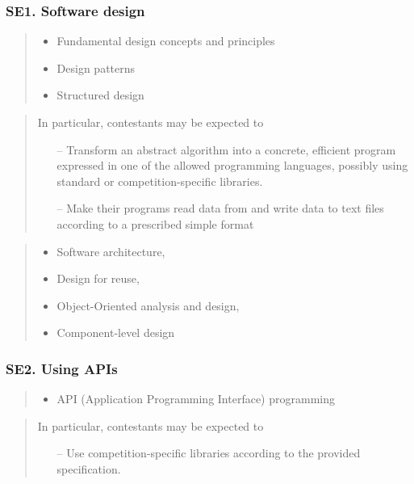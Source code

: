 \documentclass[a4paper,11pt,oneside]{article}
\newcommand{\cmark}{\ding{51}}%
\newcommand{\xmark}{\ding{55}}%
\newcommand{\CC}[1]{#1}
\newcommand{\Ccodeonly}{{\small\cmark\faFileText}}
\newcommand{\Cexcluded}{{\small\xmark}}
\newcommand{\Icodeonly}{\item[\hbox to 1.8em{\Ccodeonly\hfill}]}
\newcommand{\Iexcluded}{\item[\hbox to 1.8em{\Cexcluded\hfill}]}
\newenvironment{myitemize}{\begin{quote}\begin{itemize}\itemsep 0pt}{\end{itemize}\end{quote}}
\begin{document}
    \subsubsection*{SE1. Software design}

        \begin{myitemize}
        \Icodeonly\CC{Fundamental design concepts and principles}
        \Icodeonly\CC{Design patterns}
        \Icodeonly\CC{Structured design}
        \end{myitemize}

        \begin{quote}
        In particular, contestants may be expected to
        \begin{itemize}
        \itemsep -3pt
        \item[--] Transform an abstract algorithm into a concrete, efficient program expressed in one of the allowed programming languages, possibly using standard or competition-specific libraries.
        \item[--] Make their programs read data from and write data to text files according to a prescribed simple format
        \end{itemize}
        \end{quote}

        \begin{myitemize}
        \Iexcluded \CC{Software architecture},
        \Iexcluded \CC{Design for reuse},
        \Iexcluded \CC{Object-Oriented analysis and design},
        \Iexcluded \CC{Component-level design}
        \end{myitemize}

    \subsubsection*{SE2. Using APIs}

        \begin{myitemize}
        \Icodeonly\CC{API (Application Programming Interface) programming}
        \end{myitemize}

        \begin{quote}
        In particular, contestants may be expected to
        \begin{itemize}
        \itemsep -3pt
        \item[--] Use competition-specific libraries according to the provided specification.
        \end{itemize}
        \end{quote}
\end{document}
